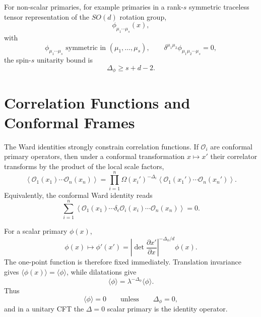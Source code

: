 For non-scalar primaries, for example primaries in a rank-\(s\)
symmetric traceless tensor representation of the \(SO(d)\) rotation
group,
\[
  \phi_{\mu_1\cdots\mu_s}(x),
\]
with
\[
  \phi_{\mu_1\cdots\mu_s}
  \text{ symmetric in }(\mu_1,\ldots,\mu_s),
  \qquad
  \delta^{\mu_1\mu_2}\phi_{\mu_1\mu_2\cdots\mu_s}=0,
\]
the spin-\(s\) unitarity bound is
\[
  \Delta_\phi\ge s+d-2.
\]

\section{Correlation Functions and Conformal Frames}

The Ward identities strongly constrain correlation functions.  If
\(\mathcal O_i\) are conformal primary operators, then under a conformal
transformation \(x\mapsto x'\) their correlator transforms by the product
of the local scale factors,
\[
  \left\langle
    \mathcal O_1(x_1)\cdots\mathcal O_n(x_n)
  \right\rangle
  =
  \prod_{i=1}^n
  \Omega(x_i')^{-\Delta_i}
  \left\langle
    \mathcal O_1(x_1')\cdots\mathcal O_n(x_n')
  \right\rangle .
\]
Equivalently, the conformal Ward identity reads
\[
  \sum_{i=1}^n
  \left\langle
    \mathcal O_1(x_1)\cdots
    \delta_\epsilon\mathcal O_i(x_i)\cdots
    \mathcal O_n(x_n)
  \right\rangle=0.
\]

For a scalar primary \(\phi(x)\),
\[
  \phi(x)\longmapsto \phi'(x')
  =
  \left|\det\frac{\partial x'}{\partial x}\right|^{-\Delta_\phi/d}
  \phi(x).
\]
The one-point function is therefore fixed immediately.  Translation
invariance gives \(\langle\phi(x)\rangle=\langle\phi\rangle\), while
dilatations give
\[
  \langle\phi\rangle
  =
  \lambda^{-\Delta_\phi}\langle\phi\rangle.
\]
Thus
\[
  \langle\phi\rangle=0
  \qquad\text{unless}\qquad
  \Delta_\phi=0,
\]
and in a unitary CFT the \(\Delta=0\) scalar primary is the identity
operator.

